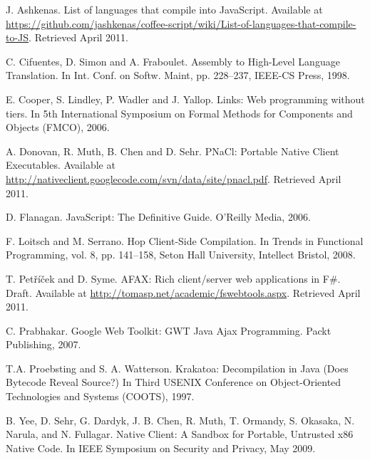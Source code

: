 \documentclass[preprint,10pt]{sigplanconf}
\begin{document}
\begin{thebibliography}{}
\softraggedright

 J. Ashkenas.
List of languages that compile into JavaScript. Available at \url{https://github.com/jashkenas/coffee-script/wiki/List-of-languages-that-compile-to-JS}.
Retrieved April 2011.

 C. Cifuentes, D. Simon and A. Fraboulet.
Assembly to High-Level Language Translation. In Int. Conf. on Softw. Maint, pp. 228--237, IEEE-CS Press, 1998.

 E. Cooper, S. Lindley, P. Wadler and J. Yallop.
Links: Web programming without tiers. In 5th International Symposium on Formal Methods for Components and Objects (FMCO), 2006.

 A. Donovan, R. Muth, B. Chen and D. Sehr.
PNaCl: Portable Native Client Executables. Available at
\url{http://nativeclient.googlecode.com/svn/data/site/pnacl.pdf}. Retrieved April 2011.

 D. Flanagan.
JavaScript: The Definitive Guide. O'Reilly Media, 2006.

 F. Loitsch and M. Serrano.
Hop Client-Side Compilation. In Trends in Functional Programming, vol. 8, pp. 141--158, Seton Hall University, Intellect Bristol, 2008.

 T. Petříček and D. Syme.
AFAX: Rich client/server web applications in F\#. Draft. Available at \url{http://tomasp.net/academic/fswebtools.aspx}. Retrieved April 2011.

 C. Prabhakar.
Google Web Toolkit: GWT Java Ajax Programming. Packt Publishing, 2007.

 T.A. Proebsting and S. A. Watterson.
Krakatoa: Decompilation in Java (Does Bytecode Reveal Source?) In Third USENIX Conference on Object-Oriented Technologies and Systems (COOTS), 1997.

 B. Yee, D. Sehr, G. Dardyk, J. B. Chen, R. Muth, T. Ormandy, S.
Okasaka, N. Narula, and N. Fullagar. Native Client: A Sandbox for
Portable, Untrusted x86 Native Code. In IEEE Symposium on
Security and Privacy, May 2009.

\end{thebibliography}
\end{document}
